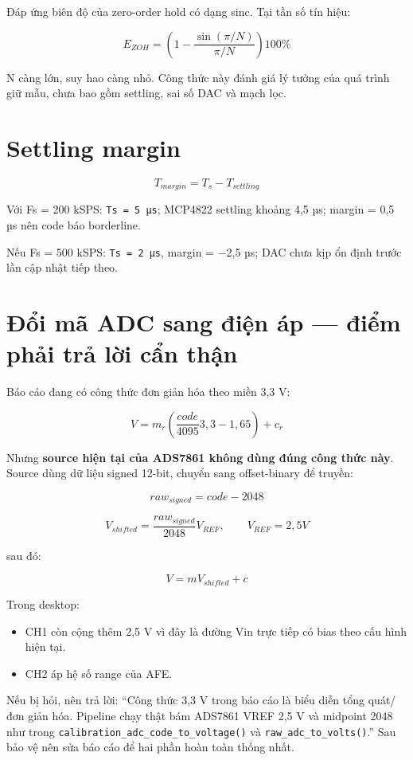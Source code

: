 \documentclass[12pt,a4paper,oneside]{article}
\newcommand{\inlinecode}[1]{\texttt{#1}}
\begin{document}
Đáp ứng biên độ của zero-order hold có dạng sinc. Tại tần số tín hiệu:

\[
E_{ZOH}=\left(1-\frac{\sin(\pi/N)}{\pi/N}\right)100\%
\]

N càng lớn, suy hao càng nhỏ. Công thức này đánh giá lý tưởng của quá trình giữ mẫu, chưa bao gồm settling, sai số DAC và mạch lọc.

\section{Settling margin}

\[
T_{margin}=T_s-T_{settling}
\]

Với Fs = 200 kSPS: \inlinecode{Ts = 5 µs}; MCP4822 settling khoảng 4,5 µs; margin = 0,5 µs nên code báo borderline.

Nếu Fs = 500 kSPS: \inlinecode{Ts = 2 µs}, margin = −2,5 µs; DAC chưa kịp ổn định trước lần cập nhật tiếp theo.

\section{Đổi mã ADC sang điện áp — điểm phải trả lời cẩn thận}

Báo cáo đang có công thức đơn giản hóa theo miền 3,3 V:

\[
V=m_r\left(\frac{code}{4095}3,3-1,65\right)+c_r
\]

Nhưng \textbf{source hiện tại của ADS7861 không dùng đúng công thức này}. Source dùng dữ liệu signed 12-bit, chuyển sang offset-binary để truyền:

\[
raw_{signed}=code-2048
\]

\[
V_{shifted}=\frac{raw_{signed}}{2048}V_{REF},\qquad V_{REF}=2,5V
\]

sau đó:

\[
V=mV_{shifted}+c
\]

Trong desktop:

\begin{itemize}
\item CH1 còn cộng thêm 2,5 V vì đây là đường Vin trực tiếp có bias theo cấu hình hiện tại.
\item CH2 áp hệ số range của AFE.
\end{itemize}

Nếu bị hỏi, nên trả lời: “Công thức 3,3 V trong báo cáo là biểu diễn tổng quát/đơn giản hóa. Pipeline chạy thật bám ADS7861 VREF 2,5 V và midpoint 2048 như trong \inlinecode{calibration\_adc\_code\_to\_voltage()} và \inlinecode{raw\_adc\_to\_volts()}.” Sau bảo vệ nên sửa báo cáo để hai phần hoàn toàn thống nhất.
\end{document}
